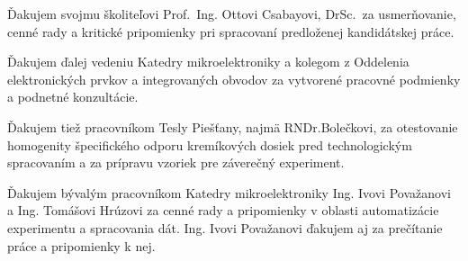 \par Ďakujem svojmu školiteľovi Prof.\ Ing. Ottovi Csabayovi, DrSc.\ za
usmerňovanie, cenné rady a kritické pripomienky pri spracovaní
predloženej kandidátskej práce.

\par Ďakujem ďalej vedeniu Katedry mikroelektroniky a kolegom z
Oddelenia elektronických prvkov a integrovaných obvodov za vytvorené
pracovné podmienky a podnetné konzultácie.

\par Ďakujem tiež pracovníkom Tesly Piešťany, najmä RNDr.Bolečkovi, za
otestovanie homogenity špecifického odporu kremíkových dosiek pred
technologickým spracovaním a za prípravu vzoriek pre záverečný
experiment.

\par Ďakujem bývalým pracovníkom Katedry mikroelektroniky
Ing. Ivovi Považanovi a Ing. Tomášovi Hrúzovi za cenné rady a
pripomienky v oblasti automatizácie experimentu a spracovania
dát. Ing. Ivovi Považanovi ďakujem aj za prečítanie práce a
pripomienky k nej.
